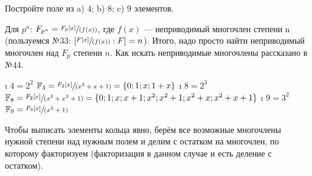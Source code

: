 \begin{problem}[45 (11.3)]
Постройте поле из a) $4$; b) $8$; c) $9$ элементов.
\end{problem}

\begin{solution}

Для \(p^n\): \(F_{p^n} = \sfrac{F_p[x]}{(f(x))}\), где \(f(x)\) --- неприводимый многочлен степени n (пользуемся №33: $[\sfrac{F[x]}{(f(x))}:F] = n$). Итого, надо просто найти неприводимый многочлен над \(F_p\) степени \(n\). Как искать неприводимые многочлены рассказано в №44.

\begin{enumerate}
\def\labelenumi{\alph{enumi})}
\tightlist
\i
  \(4=2^2\)
  \(\mathbb{F}_4 = \sfrac{F_2[x]}{(x^2+x+1)} = \{0; 1;x;1+x\}\)
\i
  \(8=2^3\)
  \(\mathbb{F}_8 = \sfrac{F_2[x]}{(x^3+x^2+1)} = \{0; 1; x; x+1; x^2; x^2+1; x^2+x; x^2+x+1 \}\)
\i
  \(9=3^2\)
  \(\mathbb{F}_9 = \sfrac{F_3[x]}{(x^2+1)}\)
\end{enumerate}

Чтобы выписать элементы кольца явно, берём все возможные многочлены нужной степени над нужным полем и делим с остатком на многочлен, по которому факторизуем (факторизация в данном случае и есть деление с остатком).

\end{solution}


